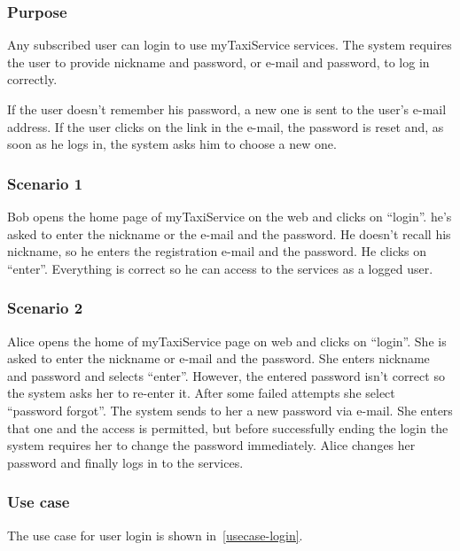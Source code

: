 \label{user-login}
\subsubsection{Purpose}
Any subscribed user can login to use myTaxiService services.
The system requires the user to provide nickname and password, or e-mail and password, to log in correctly.

If the user doesn't remember his password, a new one is sent to the user's e-mail address. If the user clicks on the link in the e-mail, the password is reset and, as soon as he logs in, the system asks him to choose a new one. 

\subsubsection{Scenario 1}
Bob opens the home page of myTaxiService on the web and clicks on ``login''. 
he's asked to enter the nickname or the e-mail and the password. He doesn't recall his nickname, so he enters the registration e-mail and the password. He clicks on ``enter''. 
Everything is correct so he can access to the services as a logged user.

\subsubsection{Scenario 2}
Alice opens the home of myTaxiService page on web and clicks on ``login''.  
She is asked to enter the nickname or e-mail and the password.
She enters nickname and password and selects ``enter''. However, the entered password isn't correct so the system asks her to re-enter it. 
After some failed attempts she select ``password forgot''.
The system sends to her a new password via e-mail. She enters that one and the access is permitted, but before successfully ending the login the system requires her to change the password immediately. 
Alice changes her password and finally logs in to the services.



\subsubsection{Use case}
The use case for user login is shown in~\autoref{usecase-login}.

